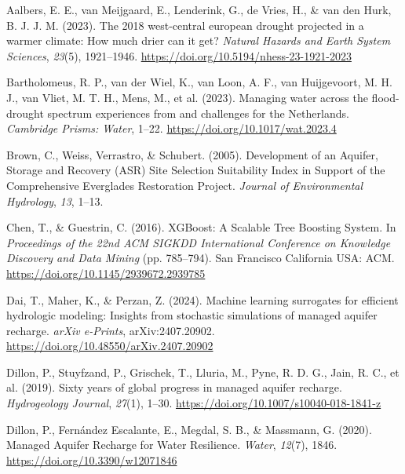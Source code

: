 \documentclass[
]{agujournal2019}
\newlength{\cslhangindent}
\newenvironment{CSLReferences}[2] %
 {\begin{list}{}{%
  \setlength{\itemindent}{0pt}
  \setlength{\leftmargin}{0pt}
  \setlength{\parsep}{0pt}
  \ifodd #1
   \setlength{\leftmargin}{\cslhangindent}
   \setlength{\itemindent}{-1\cslhangindent}
  \fi
  \setlength{\itemsep}{#2\baselineskip}}}
 {\end{list}}
\begin{document}
\label{refs}
\begin{CSLReferences}{1}{0}
\vspace{1em}

Aalbers, E. E., van Meijgaard, E., Lenderink, G., de Vries, H., \& van
den Hurk, B. J. J. M. (2023). The 2018 west-central european drought
projected in a warmer climate: How much drier can it get? \emph{Natural
Hazards and Earth System Sciences}, \emph{23}(5), 1921--1946.
\url{https://doi.org/10.5194/nhess-23-1921-2023}

Bartholomeus, R. P., van der Wiel, K., van Loon, A. F., van Huijgevoort,
M. H. J., van Vliet, M. T. H., Mens, M., et al. (2023). Managing water
across the flood-drought spectrum {\textendash} experiences from and
challenges for the Netherlands. \emph{Cambridge Prisms: Water}, 1--22.
\url{https://doi.org/10.1017/wat.2023.4}

Brown, C., Weiss, Verrastro, \& Schubert. (2005). Development of an
{Aquifer}, {Storage} and {Recovery} ({ASR}) {Site} {Selection}
{Suitability} {Index} in {Support} of the {Comprehensive} {Everglades}
{Restoration} {Project}. \emph{Journal of Environmental Hydrology},
\emph{13}, 1--13.

Chen, T., \& Guestrin, C. (2016). {XGBoost}: {A} {Scalable} {Tree}
{Boosting} {System}. In \emph{Proceedings of the 22nd {ACM} {SIGKDD}
{International} {Conference} on {Knowledge} {Discovery} and {Data}
{Mining}} (pp. 785--794). San Francisco California USA: ACM.
\url{https://doi.org/10.1145/2939672.2939785}

Dai, T., Maher, K., \& Perzan, Z. (2024). {Machine learning surrogates
for efficient hydrologic modeling: Insights from stochastic simulations
of managed aquifer recharge}. \emph{arXiv e-Prints}, arXiv:2407.20902.
\url{https://doi.org/10.48550/arXiv.2407.20902}

Dillon, P., Stuyfzand, P., Grischek, T., Lluria, M., Pyne, R. D. G.,
Jain, R. C., et al. (2019). Sixty years of global progress in managed
aquifer recharge. \emph{Hydrogeology Journal}, \emph{27}(1), 1--30.
\url{https://doi.org/10.1007/s10040-018-1841-z}

Dillon, P., Fernández Escalante, E., Megdal, S. B., \& Massmann, G.
(2020). Managed Aquifer Recharge for Water Resilience. \emph{Water},
\emph{12}(7), 1846. \url{https://doi.org/10.3390/w12071846}


\end{CSLReferences}
\end{document}
